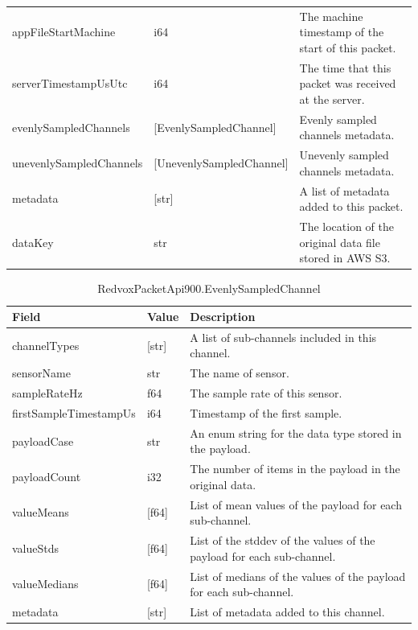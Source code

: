 \begin{table}
\begin{tabularx}{\textwidth}{llX}
		appFileStartMachine & i64 & The machine timestamp of the start of this packet. \\
		serverTimestampUsUtc & i64 & The time that this packet was received at the server. \\
		evenlySampledChannels & [EvenlySampledChannel] & Evenly sampled channels metadata. \\
		unevenlySampledChannels& [UnevenlySampledChannel] & Unevenly sampled channels metadata. \\
		metadata & [str] & A list of metadata added to this packet. \\
		dataKey & str & The location of the original data file stored in AWS S3. \\
		\bottomrule
	\end{tabularx}
	\label{table:RedvoxPacketApi900}
\end{table}

\begin{table}[H]
	\centering
	\caption{RedvoxPacketApi900.EvenlySampledChannel}
	\begin{tabularx}{\textwidth}{llX}
		\toprule
		\textbf{Field} & \textbf{Value} & \textbf{Description} \\
		\midrule
		channelTypes & [str] & A list of sub-channels included in this channel. \\
		sensorName & str & The name of sensor. \\
		sampleRateHz & f64 & The sample rate of this sensor. \\
		firstSampleTimestampUs & i64 & Timestamp of the first sample. \\
		payloadCase & str & An enum string for the data type stored in the payload. \\
		payloadCount & i32 & The number of items in the payload in the original data. \\
		valueMeans & [f64] & List of mean values of the payload for each sub-channel. \\
		valueStds & [f64] & List of the stddev of the values of the payload for each sub-channel. \\
		valueMedians & [f64] & List of medians of the values of the payload for each sub-channel. \\
		metadata & [str] & List of metadata added to this channel. \\
		\bottomrule
	\end{tabularx}
	\label{table:EvenlySampledChannel}
\end{table}

